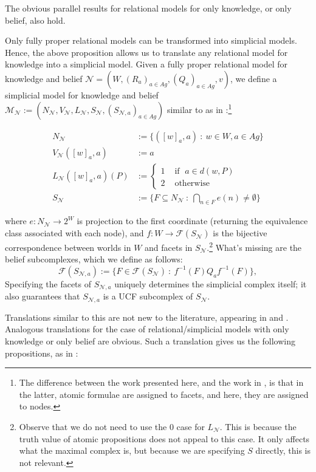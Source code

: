 \documentclass[11pt]{article}
\theoremstyle{definition}
\newcommand{\M}{\mathcal{M}}
\newcommand{\F}{\mathcal{F}}
\renewcommand{\M}{\mathcal{M}}
\newcommand{\N}{\mathcal{N}}
\begin{document}
	The obvious parallel results for relational models for only knowledge, or only belief, also hold.
	
	Only fully proper relational models can be transformed into simplicial models. Hence, the above proposition allows us to translate any relational model for knowledge into a simplicial model.	Given a fully proper relational model for knowledge and belief $\N=(W,(R_a)_{a\in Ag},(Q_a)_{a\in Ag},v)$, we define a simplicial model for knowledge and belief $\M_{\N}:=(N_{\N},V_{\N},L_{\N},S_{\N},(S_{\N,a})_{a\in Ag})$ similar to as in \cite{BelSimp}:\footnote{The difference between the work presented here, and the work in \cite{BelSimp}, is that in the latter, atomic formulae are assigned to facets, and here, they are assigned to nodes.}
	
\begin{align*}
		N_{\N} &:= \{([w]_{a},a) \: : \: w \in W, a \in Ag\}\\
V_{\N}([w]_{a},a) &:= a\\
L_{\N}([w]_{a},a)(P) &:=\begin{cases}
	1& \text{ if }\;a\in d(w,P)\\
	2& \text{ otherwise}
\end{cases}\\
S_{\N} &:= \{F \subseteq N_{\N} \: : \: \bigcap_{n \in F} e(n) \neq \emptyset\}
\end{align*}

	where $e: N_{\N} \to 2^{W}$ is projection to the first coordinate (returning the equivalence class associated with each node), and $f \colon W \to \F(S_{\N})$ is the bijective correspondence between worlds in $W$ and facets in $S_{\N}$.\footnote{Observe that we do not need to use the 0 case for $L_\N$. This is because the truth value of atomic propositions does not appeal to this case. It only affects what the maximal complex is, but because we are specifying $S$ directly, this is not relevant.} What's missing are the belief subcomplexes, which we define as follows:
	$$\mathcal{F}(S_{\N,a}) := \{F\in\mathcal{F}(S_{\N}) \: : \: f^{-1}(F) Q_{a} f^{-1}(F)\},$$
	Specifying the facets of $S_{\N,a}$ uniquely determines the simplicial complex itself; it also guarantees that $S_{\N,a}$ is a UCF subcomplex of $S_{\N}$. 
	
	Translations similar to this are not new to the literature, appearing in \cite{SimpDEL} and \cite{KaSC}. Analogous translations for the case of relational/simplicial models with only knowledge or only belief are obvious. Such a translation gives us the following propositions, as in \cite{BelSimp}:
	
\end{document}
